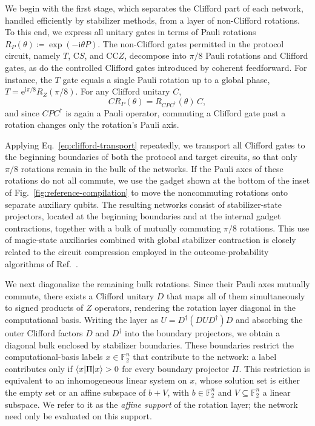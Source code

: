 \documentclass[aps,prx,twocolumn,superscriptaddress,longbibliography]{revtex4-2}
\newcommand{\F}{\mathbb F_2}
\begin{document}
We begin with the first stage, 
which separates the Clifford part of each network, handled efficiently by stabilizer methods, 
from a layer of non-Clifford rotations. 
To this end, we express all unitary gates in terms of Pauli rotations 
$R_P(\theta)\coloneqq\exp(-\mathrm{i}\theta P)$. 
The non-Clifford gates permitted in the protocol circuit, namely $T$, $\mathrm{C}S$, and $\mathrm{CC}Z$, 
decompose into $\pi/8$ Pauli rotations and Clifford gates, 
as do the controlled Clifford gates introduced by coherent feedforward. 
For instance, the $T$ gate equals a single Pauli rotation up to a global phase, 
$T=\mathrm{e}^{\mathrm{i}\pi/8}R_Z(\pi/8)$. 
For any Clifford unitary $C$, 
\begin{equation}
 C R_P(\theta)=R_{CPC^\dagger}(\theta)\,C,
 \label{eq:clifford-transport}
\end{equation}
and since $CPC^\dagger$ is again a Pauli operator, 
commuting a Clifford gate past a rotation changes only the rotation's Pauli axis.

Applying Eq.~\eqref{eq:clifford-transport} repeatedly, 
we transport all Clifford gates to the beginning boundaries 
of both the protocol and target circuits, 
so that only $\pi/8$ rotations remain in the bulk of the networks. 
If the Pauli axes of these rotations do not all commute, 
we use the gadget shown at the bottom of the inset of Fig.~\ref{fig:reference-compilation} 
to move the noncommuting rotations onto separate auxiliary qubits. 
The resulting networks consist of stabilizer-state projectors, 
located at the beginning boundaries and at the internal gadget contractions, 
together with a bulk of mutually commuting $\pi/8$ rotations. 
This use of magic-state auxiliaries combined with global stabilizer contraction 
is closely related to the circuit compression employed in the outcome-probability algorithms 
of Ref.~\cite{pashayanFastEstimationOutcome2022}.

We next diagonalize the remaining bulk rotations. 
Since their Pauli axes mutually commute, 
there exists a Clifford unitary $D$ that maps all of them simultaneously to signed products of $Z$ operators, 
rendering the rotation layer diagonal in the computational basis. 
Writing the layer as $U=D^\dagger(DUD^\dagger)D$ 
and absorbing the outer Clifford factors $D$ and $D^\dagger$ into the boundary projectors, 
we obtain a diagonal bulk enclosed by stabilizer boundaries. 
These boundaries restrict the computational-basis labels $x\in\F^n$ that contribute to the network: 
a label contributes only if $\braket{x|\Pi|x}>0$ for every boundary projector $\Pi$. 
This restriction is equivalent to an inhomogeneous linear system on $x$,
whose solution set is either the empty set or an affine subspace of $b+V$, 
with $b\in\F^n$ and $V\subseteq\F^n$ a linear subspace. 
We refer to it as the \emph{affine support} of the rotation layer; 
the network need only be evaluated on this support.
\end{document}
